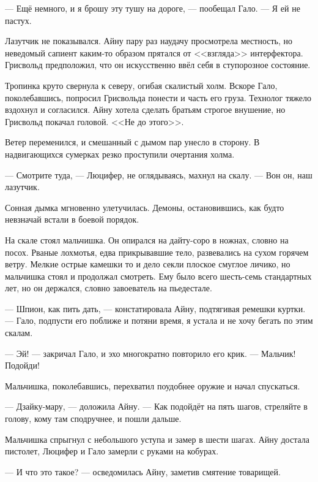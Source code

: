 --- Ещё немного, и я брошу эту тушу на дороге, --- пообещал Гало.
--- Я ей не пастух.

Лазутчик не показывался.
Айну пару раз наудачу просмотрела местность, но неведомый сапиент каким-то образом прятался от <<взгляда>> интерфектора.
Грисвольд предположил, что он искусственно ввёл себя в ступорозное состояние.

Тропинка круто свернула к северу, огибая скалистый холм.
Вскоре Гало, поколебавшись, попросил Грисвольда понести и часть его груза.
Технолог тяжело вздохнул и согласился.
Айну хотела сделать братьям строгое внушение, но Грисвольд покачал головой.
<<Не до этого>>.

Ветер переменился, и смешанный с дымом пар унесло в сторону.
В надвигающихся сумерках резко проступили очертания холма.

--- Смотрите туда, --- Люцифер, не оглядываясь, махнул на скалу.
--- Вон он, наш лазутчик.

Сонная дымка мгновенно улетучилась.
Демоны, остановившись, как будто невзначай встали в боевой порядок.

На скале стоял мальчишка.
Он опирался на дайту-соро\FM{} в ножнах, словно на посох.
Рваные лохмотья, едва прикрывавшие тело, развевались на сухом горячем ветру.
Мелкие острые камешки то и дело секли плоское смуглое личико, но мальчишка стоял и продолжал смотреть.
Ему было всего шесть-семь стандартных лет, но он держался, словно завоеватель на пьедестале.

--- Шпион, как пить дать, --- констатировала Айну, подтягивая ремешки куртки.
--- Гало, подпусти его поближе и потяни время, я устала и не хочу бегать по этим скалам.

--- Эй! --- закричал Гало, и эхо многократно повторило его крик.
--- Мальчик!
Подойди!

Мальчишка, поколебавшись, перехватил поудобнее оружие и начал спускаться.

--- Дзайку-мару, --- доложила Айну.
--- Как подойдёт на пять шагов, стреляйте в голову, кому там сподручнее, и пошли дальше.

Мальчишка спрыгнул с небольшого уступа и замер в шести шагах.
Айну достала пистолет, Люцифер и Гало замерли с руками на кобурах.

--- И что это такое? --- осведомилась Айну, заметив смятение товарищей.

